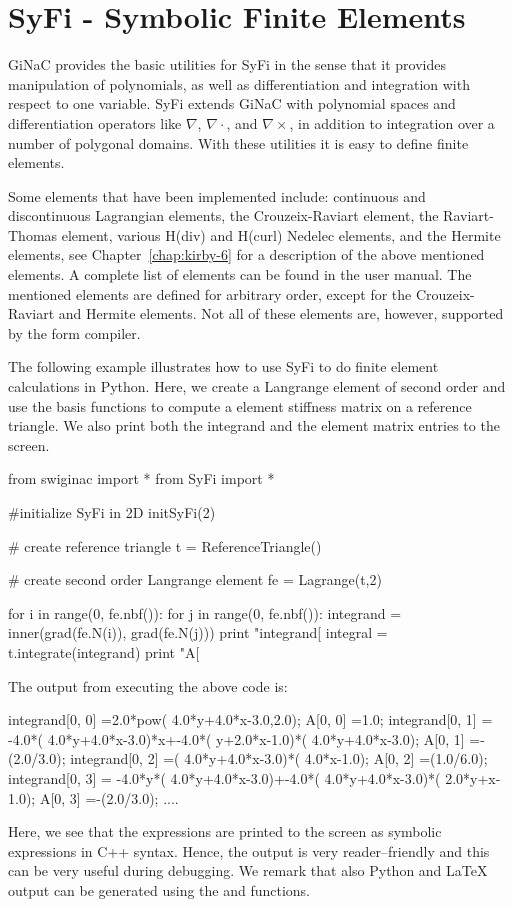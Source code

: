 \section{SyFi - Symbolic Finite Elements}

GiNaC provides the basic utilities for SyFi in the sense
that it provides manipulation of polynomials, as well as differentiation and integration  
with respect to one variable. SyFi extends GiNaC with polynomial spaces and 
differentiation operators like $\nabla$, $\nabla\cdot$, and $\nabla\times$, 
in addition to integration over a number of polygonal domains. 
With these utilities it is easy to define finite elements. 

Some elements that have been implemented include:
continuous and discontinuous Lagrangian elements, 
the Crouzeix-Raviart element, the Raviart-Thomas element, various H(div) and H(curl) Nedelec 
elements, and the Hermite elements, see Chapter~\ref{chap:kirby-6} for
a description of the above mentioned elements. 
A complete list of elements can be found
in the user manual. The mentioned elements are defined for arbitrary order, except for
the Crouzeix-Raviart and Hermite elements. Not all of these elements are, however, 
supported by the form compiler. 

The following example illustrates how to use SyFi to do finite element calculations in Python. 
Here, we create a Langrange element of second order and use the basis functions to compute a 
element stiffness matrix on a reference triangle. We also print both the integrand and 
the element matrix entries to the screen. 
\begin{python}
from swiginac import *
from SyFi import * 

#initialize SyFi in 2D
initSyFi(2)

# create reference triangle 
t = ReferenceTriangle() 

# create second order Langrange element
fe = Lagrange(t,2)

for i in range(0, fe.nbf()):
    for j in range(0, fe.nbf()):
	integrand = inner(grad(fe.N(i)), grad(fe.N(j)))
	print "integrand[%
	integral = t.integrate(integrand) 
	print "A[%
\end{python}
The output from executing the above code is: 
\begin{c++}
integrand[0, 0]  =2.0*pow( 4.0*y+4.0*x-3.0,2.0);
A[0, 0]          =1.0;
integrand[0, 1]  = -4.0*( 4.0*y+4.0*x-3.0)*x+-4.0*( y+2.0*x-1.0)*( 4.0*y+4.0*x-3.0);
A[0, 1]          =-(2.0/3.0);
integrand[0, 2]  =( 4.0*y+4.0*x-3.0)*( 4.0*x-1.0);
A[0, 2]          =(1.0/6.0);
integrand[0, 3]  = -4.0*y*( 4.0*y+4.0*x-3.0)+-4.0*( 4.0*y+4.0*x-3.0)*( 2.0*y+x-1.0);
A[0, 3]          =-(2.0/3.0);
....
\end{c++}
Here, we see that the expressions are printed to the screen as symbolic expressions
in C++ syntax. Hence, the output is very reader--friendly and this can be very useful during debugging.  
We remark that also Python and LaTeX output can be generated using the  and  functions. 

